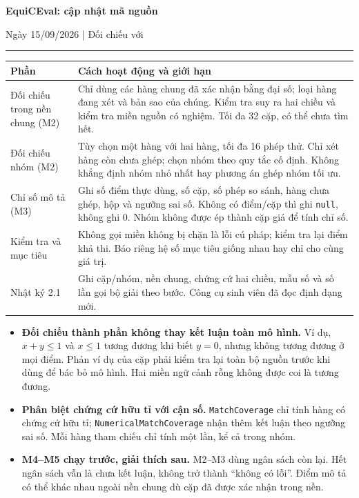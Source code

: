 \documentclass[11pt,a4paper]{article}
\newcommand{\heading}[1]{\par\vspace{4pt}{\large\bfseries #1}\par}
\begin{document}
{\LARGE\bfseries EquiCEval: cập nhật mã nguồn}\par
{\small Ngày 15/09/2026 | Đối chiếu với }\par
\hrule\vspace{5pt}

\heading{1. Đã bổ sung gì?}
\begin{tabularx}{\textwidth}{@{}p{3.5cm}Y@{}}
\toprule
\textbf{Phần} & \textbf{Cách hoạt động và giới hạn}\\
\midrule
Đối chiếu trong nền chung (M2) & Chỉ dùng các hàng chung đã xác nhận bằng đại số;
loại hàng đang xét và bản sao của chúng. Kiểm tra suy ra hai chiều và kiểm tra
miền nguồn có nghiệm. Tối đa 32 cặp, có thể chưa tìm hết.\\
Đối chiếu nhóm (M2) & Tùy chọn một hàng với hai hàng, tối đa 16 phép thử.
Chỉ xét hàng còn chưa ghép; chọn nhóm theo quy tắc cố định. Không khẳng định
nhóm nhỏ nhất hay phương án ghép nhóm tối ưu.\\
Chỉ số mô tả (M3) & Ghi số điểm thực dùng, số cặp, số phép so sánh, hàng chưa ghép,
hộp và ngưỡng sai số. Không có điểm/cặp thì ghi \texttt{null}, không ghi 0.
Nhóm không được ép thành cặp giả để tính chỉ số.\\
Kiểm tra và mục tiêu & Không gọi miền không bị chặn là lỗi cú pháp; kiểm tra
lại điểm khả thi. Báo riêng hệ số mục tiêu giống nhau hay chỉ cho cùng giá trị.\\
Nhật ký 2.1 & Ghi cặp/nhóm, nền chung, chứng cứ hai chiều, mẫu số và số lần gọi
bộ giải theo bước. Công cụ sinh viên đã đọc định dạng mới.\\
\bottomrule
\end{tabularx}

\heading{2. Ba quy tắc để không kết luận nhầm}
\begin{itemize}
\item \textbf{Đối chiếu thành phần không thay kết luận toàn mô hình.}
Ví dụ, $x+y\leq1$ và $x\leq1$ tương đương khi biết $y=0$, nhưng không tương đương
ở mọi điểm. Phản ví dụ của cặp phải kiểm tra lại toàn bộ nguồn trước khi dùng
để bác bỏ mô hình. Hai miền ngữ cảnh rỗng không được coi là tương đương.
\item \textbf{Phân biệt chứng cứ hữu tỉ với cận số.} \texttt{MatchCoverage}
chỉ tính hàng có chứng cứ hữu tỉ; \texttt{Numerical\allowbreak Match\allowbreak Coverage} nhận thêm
kết luận theo ngưỡng sai số. Mỗi hàng tham chiếu chỉ tính một lần, kể cả trong nhóm.
\item \textbf{M4--M5 chạy trước, giải thích sau.} M2--M3 dùng ngân sách còn lại.
Hết ngân sách vẫn là chưa kết luận, không trở thành ``không có lỗi''.
Điểm mô tả có thể khác nhau ngoài nền chung dù cặp đã được xác nhận trong nền.
\end{itemize}
\end{document}

